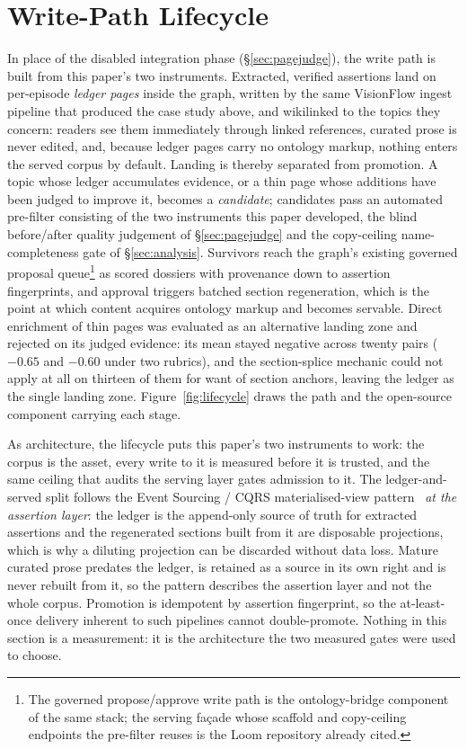 \documentclass[10pt,twocolumn]{article}
\begin{document}
\section{Write-Path Lifecycle}\label{sec:lifecycle}
In place of the disabled integration phase (\S\ref{sec:pagejudge}), the write path is built from this paper's two
instruments. Extracted, verified assertions land on
per-episode \emph{ledger pages} inside the graph, written by the same VisionFlow ingest pipeline
that produced the case study above, and wikilinked to the topics they concern: readers see them
immediately through linked references, curated prose is never edited, and, because ledger pages
carry no ontology markup, nothing enters the served corpus by default. Landing is thereby separated
from promotion. A topic whose ledger accumulates evidence, or a thin page whose additions have been
judged to improve it, becomes a \emph{candidate}; candidates pass an automated pre-filter consisting
of the two instruments this paper developed, the blind before/after quality judgement of
\S\ref{sec:pagejudge} and the copy-ceiling name-completeness gate of \S\ref{sec:analysis}.
Survivors reach the graph's existing governed proposal queue\footnote{The governed propose/approve
write path is the ontology-bridge component of the same stack; the serving fa\c{c}ade whose scaffold
and copy-ceiling endpoints the pre-filter reuses is the Loom repository already cited.} as scored
dossiers with provenance down to assertion fingerprints, and approval triggers batched section
regeneration, which is the point at which content acquires ontology markup and becomes servable.
Direct enrichment of thin pages was evaluated as an alternative landing zone and rejected on its
judged evidence: its mean stayed negative across twenty pairs ($-0.65$ and $-0.60$ under two
rubrics), and the section-splice mechanic could not apply at all on thirteen of them for want of
section anchors, leaving the ledger as the single landing zone. Figure~\ref{fig:lifecycle} draws the
path and the open-source component carrying each stage.

As architecture, the lifecycle puts this paper's two instruments to work: the corpus is the
asset, every write to it is measured before it is trusted, and the same ceiling that audits the
serving layer gates admission to it. The ledger-and-served split follows the Event Sourcing / CQRS
materialised-view pattern~\cite{fowler2005eventsourcing} \emph{at the assertion layer}: the ledger is
the append-only source of truth for extracted assertions and the regenerated sections built from it
are disposable projections, which is why a diluting projection can be discarded without data loss.
Mature curated prose predates the ledger, is retained as a source in its own right and is never
rebuilt from it, so the pattern describes the assertion layer and not the whole corpus. Promotion is
idempotent by assertion fingerprint, so the at-least-once delivery inherent to such pipelines cannot
double-promote. Nothing in this section is a measurement: it is the architecture the two measured
gates were used to choose.
\end{document}

